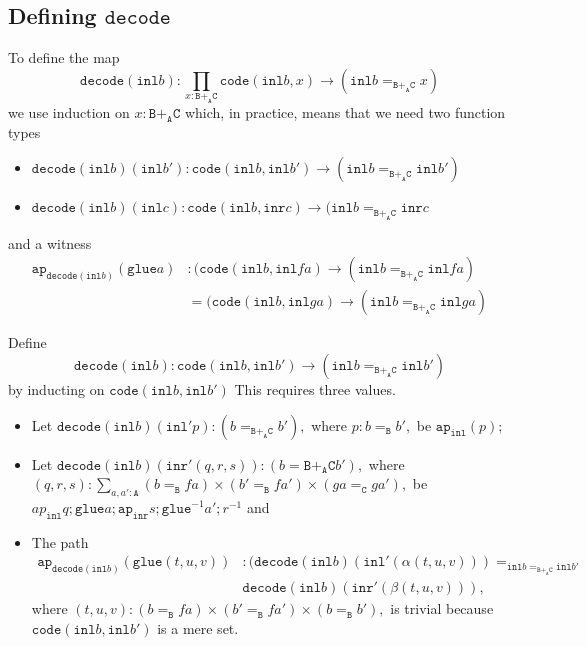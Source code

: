 \message{ !name(notes.tex)}\documentclass[12pt]{amsart}
\newcommand{\from}{\colon}
\newcommand{\type}[1]{\mathtt{#1}}
\newcommand{\tin}{\colon}
\newcommand{\A}{\type{A}}
\newcommand{\B}{\type{B}}
\newcommand{\C}{\type{C}}
\newcommand{\BAC}{\B +_{\A} \C}
\newcommand{\ap}{\type{ap}}
\newcommand{\inl}{\type{inl}}
\newcommand{\inr}{\type{inr}}
\newcommand{\glue}{\type{glue}}
\newcommand{\code}{\type{code}}
\newcommand{\decode}{\type{decode}}
\theoremstyle{remark}
\theoremstyle{definition}
\begin{document}

\subsection{Defining \( \decode \)}
\label{sec:define-decode}

To define the map
%
\begin{equation} \label{eq:decode-b-blank}
%
  \decode ( \inl b ) \from
  \prod\limits_{x \tin \BAC} \code ( \inl b , x ) \to
  ( \inl b =_{\BAC} x )
%
\end{equation}
%
we use induction on \( x \tin \BAC \) which, in practice, means that
we need two function types
%
\begin{itemize}
\item
  \(
    \decode ( \inl b ) ( \inl b' ) \from
    \code (\inl b , \inl b') \to
    ( \inl b =_{\BAC} \inl b' )
  \)
\item
  \(
    \decode ( \inl b ) ( \inl c ) \from
    \code ( \inl b , \inr c ) \to
    ( \inl b =_{\BAC} \inr c
  \) 
\end{itemize}
%
and a witness
%
\begin{align*}
  \ap_{\decode ( \inl b )} (\glue a) &
  \tin
  ( \code ( \inl b , \inl fa ) \to ( \inl b =_{\BAC} \inl fa ) \\
  & =
  ( \code ( \inl b , \inl ga ) \to ( \inl b =_{\BAC} \inl ga )
\end{align*}


Define
\[
  \decode ( \inl b ) \from
  \code ( \inl b , \inl b' ) \to
  ( \inl b =_{\BAC} \inl b' )
\]
by inducting on
%
\(
    \code ( \inl b , \inl b' )
\)
% 
This requires three values.
%
\begin{itemize}
\item
  Let
  \(
    \decode ( \inl b) (\inl' p) \tin ( b =_{\BAC} b' ),
  \)
  where
  \(
    p \tin b =_{\B} b',
  \)
  be
  \(
    \ap_{\inl} (p);
  \)
\item
  Let
  \(
    \decode (\inl b ) ( \inr' (q,r,s) ) \tin ( b ={\BAC} b' ),
  \)
  where
  \(
    (q,r,s) \tin
    \sum\limits_{a,a' \tin \A}
    ( b =_\B fa ) \times (b' =_\B fa' ) \times ( ga =_\C ga' ),
  \)  
  be
  \(
    ap_{\inl} q ; \glue a ; \ap_{\inr} s ; \glue^{-1} a' ; r^{-1}
  \)
  and
\item
  The path
  \begin{align*}
    \ap_{\decode ( \inl b )} ( \glue (t,u,v) )
    & \tin ( \decode ( \inl b )
      ( \inl' ( \alpha (t,u,v) ) ) =_{\inl b =_{\BAC} \inl b'} \\
    & \decode ( \inl b ) ( \inr' ( \beta (t,u,v) ) ),
  \end{align*}
  where
  \(
    (t,u,v) \tin
    ( b =_\B fa ) \times ( b' =_\B fa' ) \times ( b =_\B b' ),
  \)
  is trivial because
  \(
    \code ( \inl b , \inl b' )
  \)
  is a mere set.
\end{itemize}
\end{document}
